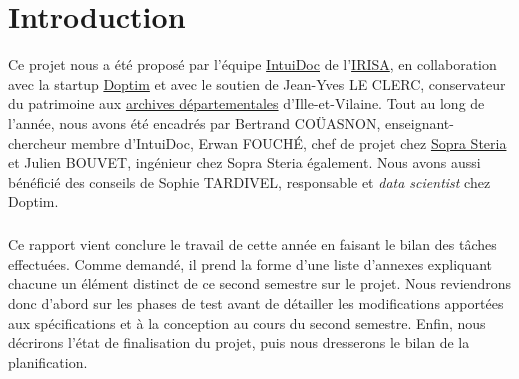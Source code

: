 \chapter{Introduction}
\pagestyle{fancy}
\fancyhf{}

Ce projet nous a été proposé par l’équipe \href{https://www-intuidoc.irisa.fr/}{IntuiDoc} de l’\href{https://www.irisa.fr/}{IRISA}, en collaboration avec la startup \href{http://www.doptim.eu}{Doptim} et avec le soutien de Jean-Yves LE CLERC, conservateur du patrimoine aux \href{http://archives.ille-et-vilaine.fr/fr}{archives départementales} d'Ille-et-Vilaine. Tout au long de l’année, nous avons été encadrés par Bertrand COÜASNON, enseignant-chercheur membre d'IntuiDoc, Erwan FOUCHÉ, chef de projet chez \href{https://www.soprasteria.com/fr}{Sopra Steria} et Julien BOUVET, ingénieur chez Sopra Steria également. Nous avons aussi bénéficié des conseils de Sophie TARDIVEL, responsable et \textit{data scientist} chez Doptim.

\paragraph{}
Ce rapport vient conclure le travail de cette année en faisant le bilan des tâches effectuées. Comme demandé, il prend la forme d'une liste d'annexes expliquant chacune un élément distinct de ce second semestre sur le projet. Nous reviendrons donc d'abord sur les phases de test avant de détailler les modifications apportées aux spécifications et à la conception au cours du second semestre. Enfin, nous décrirons l'état de finalisation du projet, puis nous dresserons le bilan de la planification.